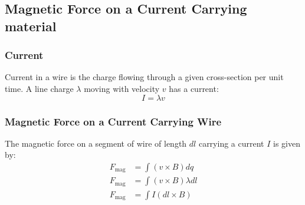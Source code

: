\documentclass{article}
\begin{document}
\subsection{Magnetic Force on a Current Carrying material}
\subsubsection*{Current}
Current in a wire is the charge flowing through a given cross-section per unit time.
A line charge $\lambda$ moving with velocity $v$ has a current:
\[ I = \lambda v \]

\subsubsection*{Magnetic Force on a Current Carrying Wire}
The magnetic force on a segment of wire of length $dl$ carrying a current $I$ is given by:
\begin{align*}
	F_{\text{mag}} & = \int (v \times B) dq         \\
	F_{\text{mag}} & = \int (v \times B) \lambda dl \\
	F_{\text{mag}} & = \int I (dl \times B)
\end{align*}

\begin{figure}[H]
	\centering
\end{figure}
\end{document}
